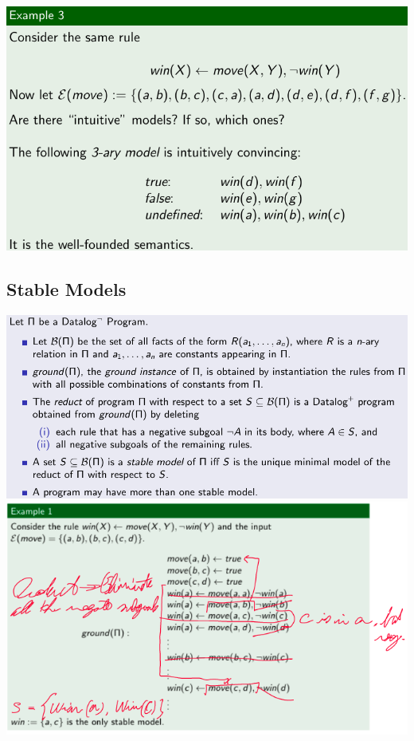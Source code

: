 \documentclass{article}
\begin{document}
\includegraphics[scale=0.3]{104.png}
\subsection{Stable Models}
\includegraphics[scale=0.4]{105.png}\\
\includegraphics[scale=0.4]{109.png}\\
\end{document}
